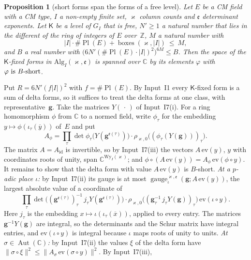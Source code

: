 \documentclass[11pt,a4paper]{article}
\makeatletter
\newcommand{\Z}{\mathbb{Z}}
\theoremstyle{plainx}
\newtheorem{proposition}[theorem]{Proposition}
\theoremstyle{uprightx}
\renewenvironment{proof}[1][Proof]{\par\pushQED{\qed}\normalfont\topsep0pt\partopsep0pt
  \trivlist\item[\hskip\labelsep\itshape #1.]\ignorespaces}{\popQED\endtrivlist\@endpefalse}
\newcommand{\CC}{\mathbb{C}}
\newcommand{\cj}[1]{\overline{#1}}
\newcommand{\Aut}{\operatorname{Aut}(\CC)}
\newcommand{\emb}[1]{\iota_{#1}}
\newcommand{\Alg}[3]{\mathrm{Alg}_{#1}(#2,#3)}
\newcommand{\Wy}[2]{\mathrm{Wy}_{#1}(#2)}
\newcommand{\rhow}[2]{\rho_{#1,#2}}
\newcommand{\gauge}[4]{\operatorname{gauge}^{#1,#2}_{\iota}(#3;#4)}
\newcommand{\Gf}[1]{G_{#1}}
\newcommand{\boxes}[2]{\operatorname{boxes}(#1,#2)}
\newcommand{\wn}[1]{\|#1\|^{2}}
\makeatother
\begin{document}
\begin{proposition}[short forms span the forms of a free level]\label{p:span}
Let $E$ be a CM field with a CM type, $I$ a non-empty finite set, $\varkappa$ column counts and
$\mathfrak{e}$ determinant exponents. Let $\mathsf{K}$ be a level of\/ $\Gf{I}$ that is free, $N'\ge1$ a natural number that
lies in the different of the ring of integers of $E$ over~$\Z$, $M$ a natural number with
\[|I|\cdot\#\operatorname{Pl}(E)+\boxes{\varkappa}{|I|}\ \le\ M ,\]
and $B$ a real number with $\bigl(6N'(\#\operatorname{Pl}(E)\cdot|I|)^2\bigr)^{6M}\le B$. Then the space of the
$\mathsf{K}$-fixed forms in $\Alg{I}{\varkappa}{\mathfrak{e}}$ is spanned over $\CC$ by its elements $\varphi$ with
$\varphi\text{ is }B\text{-short}$.
\end{proposition}
\begin{proof}
Put $R=6N'(f|I|)^2$ with $f=\#\operatorname{Pl}(E)$. By Input~I1 every $\mathsf{K}$-fixed form is a sum of delta forms, so
it suffices to treat the delta forms at one class, with representative~$\mathbf{g}$. Take the matrices $Y(\,\cdot\,)$ of
Input~I7(i). For a ring homomorphism $\phi$ from $\CC$ to a normed field, write $\phi_\tau$ for the embedding
$y\mapsto\phi(\emb{\tau}(\cj{y}))$ of~$E$ and put
\[A_\phi=\prod_{\tau}\det\phi_\tau\bigl(Y(\mathbf{g}^{\mathfrak{e}(\tau)})\bigr)\cdot\rhow{\varkappa}{0}\bigl((\phi_\tau(Y(\mathbf{g})))_\tau\bigr).\]
The matrix $A=A_{\mathrm{id}}$ is invertible, so by Input~I7(iii) the vectors $A\,\mathrm{ev}(y)$, $y$ with
coordinates roots of unity, span $\CC^{\Wy{I}{\varkappa}}$; and
$\phi\circ(A\,\mathrm{ev}(y))=A_\phi\,\mathrm{ev}(\phi\circ y)$. It remains to show that the delta form with
value $A\,\mathrm{ev}(y)$ is $B$-short. \emph{At a $p$-adic place $\iota$:} by Input~I7(ii) its gauge is at most
$\gauge{\varkappa}{\mathfrak{e}}{\mathbf{g}}{A\,\mathrm{ev}(y)}$, the largest absolute value of a coordinate of
\[\prod_\tau\det\bigl((\mathbf{g}^{\mathfrak{e}(\tau)})_\tau^{-1}\,j_\tau Y(\mathbf{g}^{\mathfrak{e}(\tau)})\bigr)\cdot\rhow{\varkappa}{0}\bigl((\mathbf{g}_\tau^{-1}\,j_\tau Y(\mathbf{g}))_\tau\bigr)\,\mathrm{ev}(\iota\circ y).\]
Here $j_\tau$ is the embedding $x\mapsto\iota(\emb{\tau}(\cj{x}))$, applied to every entry. The matrices $\mathbf{g}^{-1}Y(\mathbf{g})$ are integral, so the determinants and the Schur matrix have integral entries, and
$\mathrm{ev}(\iota\circ y)$ is integral because $\iota$ maps roots of unity to units. \emph{At $\sigma\in\Aut$:} by
Input~I7(ii) the values $\xi$ of the delta form have
$\wn{\sigma\circ\xi}\le\wn{A_\sigma\,\mathrm{ev}(\sigma\circ y)}$. By Input~I7(iii),

\end{proof}
\end{document}
